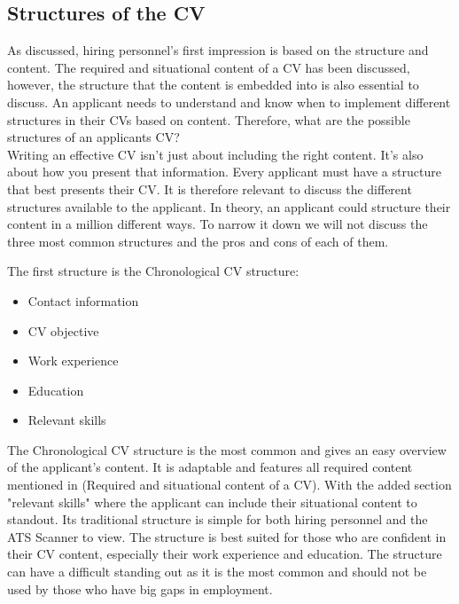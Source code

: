 \subsection{Structures of the CV}
As discussed, hiring personnel's first impression is based on the structure and content.
The required and situational content of a CV has been discussed, however, the structure that the content is embedded into is also essential to discuss.
An applicant needs to understand and know when to implement different structures in their CVs based on content.
Therefore, what are the possible structures of an applicants CV? \\

Writing an effective CV isn't just about including the right content. 
It's also about how you present that information.
Every applicant must have a structure that best presents their CV.
It is therefore relevant to discuss the different structures available to the applicant. 
In theory, an applicant could structure their content in a million different ways.
To narrow it down we will not discuss the three most common structures and the pros and cons of each of them.

The first structure is the Chronological CV structure: \\
\begin{itemize}
   \item  Contact information
   \item  CV objective
   \item  Work experience
   \item  Education
   \item  Relevant skills
   \end{itemize}
The Chronological CV structure is the most common and gives an easy overview of the applicant's content.
It is adaptable and features all required content mentioned in (Required and situational content of a CV).
With the added section "relevant skills" where the applicant can include their situational content to standout.
Its traditional structure is simple for both hiring personnel and the ATS Scanner to view.
The structure is best suited for those who are confident in their CV content, especially their work experience and education.
The structure can have a difficult standing out as it is the most common and should not be used by those who have big gaps in employment.\\
   

